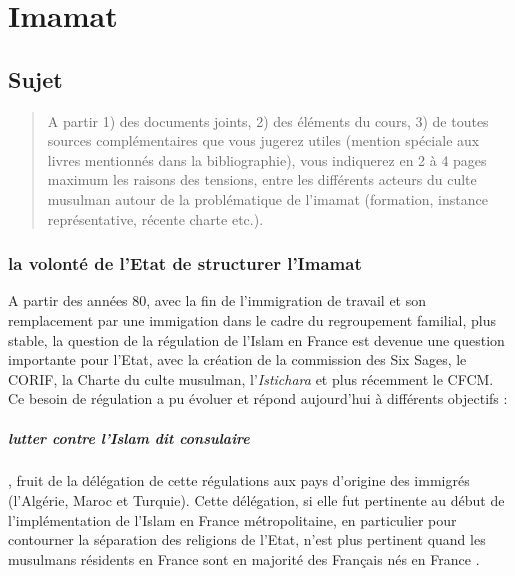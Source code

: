 \chapter{Imamat}


\section*{Sujet}

\begin{quote}
    A partir 1) des documents joints, 2) des éléments du cours, 3) de toutes sources complémentaires que vous jugerez utiles (mention spéciale aux livres mentionnés dans la bibliographie), vous indiquerez en 2 à 4 pages maximum les raisons des tensions, entre les différents acteurs du culte musulman autour de la problématique de l'imamat (formation, instance représentative, récente charte etc.).
\end{quote}

\subsection*{la volonté de l'Etat de structurer l'Imamat}

A partir des années 80, avec la fin de l'immigration de travail et son remplacement par une immigation dans le cadre du regroupement familial, plus stable, la question de la régulation de l'Islam en France est devenue une question importante pour l'Etat, avec la création de la commission des Six Sages, le CORIF, la Charte du culte musulman, l'\emph{Istichara} et plus récemment le CFCM. 
Ce besoin de régulation a pu évoluer et répond aujourd'hui à différents objectifs : 

\paragraph{lutter contre l'Islam dit consulaire}, fruit de la délégation de cette régulations aux pays d'origine des immigrés (l'Algérie, Maroc et Turquie). Cette délégation, si elle fut pertinente au début de l'implémentation de l'Islam en France métropolitaine, en particulier pour contourner la séparation des religions de l'Etat, n'est plus pertinent quand les musulmans résidents en France sont en majorité des Français nés en France . 

